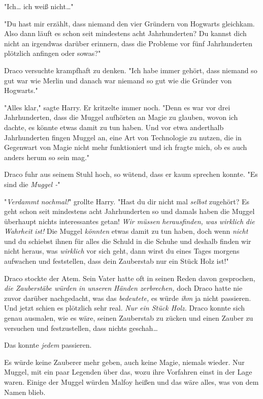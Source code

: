 {"Ich… ich weiß nicht…"

"Du hast mir erzählt, dass niemand den vier Gründern von Hogwarts gleichkam. Also dann läuft es schon seit mindestens acht Jahrhunderten? Du kannst dich nicht an irgendwas darüber erinnern, dass die Probleme vor fünf Jahrhunderten plötzlich anfingen oder sowas?"

Draco versuchte krampfhaft zu denken. "Ich habe immer gehört, dass niemand so gut war wie Merlin und danach war niemand so gut wie die Gründer von Hogwarts."

"Alles klar," sagte Harry. Er kritzelte immer noch. "Denn es war vor drei Jahrhunderten, dass die Muggel aufhörten an Magie zu glauben, wovon ich dachte, es könnte etwas damit zu tun haben. Und vor etwa anderthalb Jahrhunderten fingen Muggel an, eine Art von Technologie zu nutzen, die in Gegenwart von Magie nicht mehr funktioniert und ich fragte mich, ob es auch anders herum so sein mag."

Draco fuhr aus seinem Stuhl hoch, so wütend, dass er kaum sprechen konnte. "Es sind die \emph{Muggel -}"

"\emph{Verdammt} \emph{nochmal!}" grollte Harry. "Hast du dir nicht mal \emph{selbst} zugehört? Es geht schon seit mindestens acht Jahrhunderten so und damals haben die Muggel überhaupt nichts interessantes getan! \emph{Wir müssen} \emph{herausfinden, was} \emph{wirklich} \emph{die} \emph{Wahrheit} \emph{ist!} Die Muggel \emph{könnten} etwas damit zu tun haben, doch wenn \emph{nicht} und du schiebst ihnen für alles die Schuld in die Schuhe und deshalb finden wir nicht heraus, was \emph{wirklich} vor sich geht, dann wirst du eines Tages morgens aufwachen und feststellen, dass dein Zauberstab nur ein Stück Holz ist!"

Draco stockte der Atem. Sein Vater hatte oft in seinen Reden davon gesprochen, \emph{die Zauberstäbe würden} \emph{in unseren} \emph{Händen zerbrechen,} doch Draco hatte nie zuvor darüber nachgedacht, was das \emph{bedeutete,} es würde \emph{ihm} ja nicht passieren. Und jetzt schien es plötzlich sehr real. \emph{Nur ein Stück Holz.} Draco konnte sich genau ausmalen, wie es wäre, seinen Zauberstab zu zücken und einen Zauber zu versuchen und festzustellen, dass nichts geschah…

Das konnte \emph{jedem} passieren.

Es würde keine Zauberer mehr geben, auch keine Magie, niemals wieder. Nur Muggel, mit ein paar Legenden über das, wozu ihre Vorfahren einst in der Lage waren. Einige der Muggel würden Malfoy heißen und das wäre alles, was von dem Namen blieb.

}

